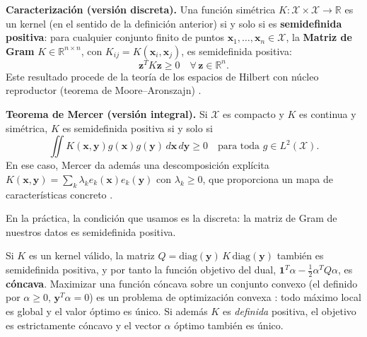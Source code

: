\documentclass[12pt, a4paper]{article}
\begin{document}
\begin{tcolorbox}[colback=teal!5!white,colframe=teal!75!black,title=\textbf{Caracterización de los kernels y Teorema de Mercer}]
\textbf{Caracterización (versión discreta).} Una función simétrica $K: \mathcal{X}\times\mathcal{X}\to\mathbb{R}$ es un kernel (en el sentido de la definición anterior) si y solo si es \textbf{semidefinida positiva}: para cualquier conjunto finito de puntos $\mathbf{x}_1, \dots, \mathbf{x}_n \in \mathcal{X}$, la \textbf{Matriz de Gram} $K \in \mathbb{R}^{n \times n}$, con $K_{ij} = K(\mathbf{x}_i, \mathbf{x}_j)$, es semidefinida positiva:
\[ \mathbf{z}^T K \mathbf{z} \geq 0 \quad \forall\, \mathbf{z} \in \mathbb{R}^n. \]
Este resultado procede de la teoría de los espacios de Hilbert con núcleo reproductor (teorema de Moore--Aronszajn) \cite{aronszajn1950theory}.

\textbf{Teorema de Mercer (versión integral).} Si $\mathcal{X}$ es compacto y $K$ es continua y simétrica, $K$ es semidefinida positiva si y solo si
\[ \iint K(\mathbf{x}, \mathbf{y}) g(\mathbf{x}) g(\mathbf{y}) \, d\mathbf{x} \, d\mathbf{y} \geq 0 \quad \text{para toda } g \in L^2(\mathcal{X}). \]
En ese caso, Mercer da además una descomposición explícita $K(\mathbf{x},\mathbf{y}) = \sum_k \lambda_k e_k(\mathbf{x}) e_k(\mathbf{y})$ con $\lambda_k \geq 0$, que proporciona un mapa de características concreto \cite{bishop2006pattern}.

En la práctica, la condición que usamos es la discreta: la matriz de Gram de nuestros datos es semidefinida positiva.
\end{tcolorbox}

\noindent Si $K$ es un kernel válido, la matriz $Q = \mathrm{diag}(\mathbf{y})\, K\, \mathrm{diag}(\mathbf{y})$ también es semidefinida positiva, y por tanto la función objetivo del dual, $\mathbf{1}^T\alpha - \frac12 \alpha^T Q \alpha$, es \textbf{cóncava}. Maximizar una función cóncava sobre un conjunto convexo (el definido por $\alpha \ge 0$, $\mathbf{y}^T\alpha = 0$) es un problema de optimización convexa \cite{boyd2004convex}: todo máximo local es global y el valor óptimo es único. Si además $K$ es \textit{definida} positiva, el objetivo es estrictamente cóncavo y el vector $\alpha$ óptimo también es único.
\end{document}
